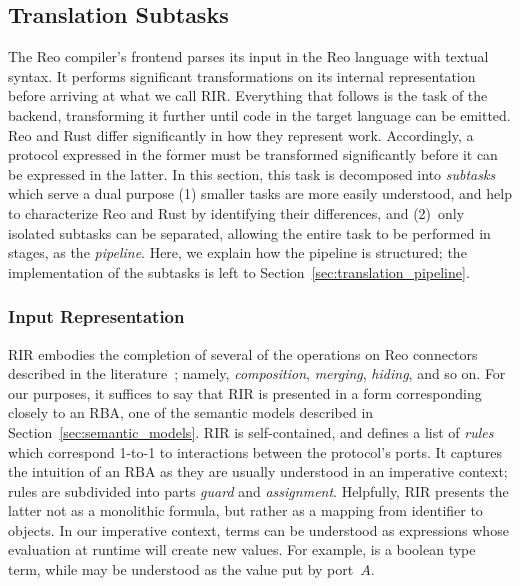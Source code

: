 \subsection{Translation Subtasks}
\label{sec:sub_tasks}
The Reo compiler's frontend parses its input in the Reo language with textual syntax. It performs significant transformations on its internal representation before arriving at what we call RIR. Everything that follows is the task of the backend, transforming it further until code in the target language can be emitted. Reo and Rust differ significantly in how they represent work. Accordingly, a protocol expressed in the former must be transformed significantly before it can be expressed in the latter. In this section, this task is decomposed into \textit{subtasks} which serve a dual purpose (1) smaller tasks are more easily understood, and help to characterize Reo and Rust by identifying their differences, and (2)~only isolated subtasks can be separated, allowing the entire task to be performed in stages, as the \textit{pipeline}.  Here, we explain how the pipeline is structured; the implementation of the subtasks is left to Section~\ref{sec:translation_pipeline}.

\subsubsection{Input Representation}
RIR embodies the completion of several of the operations on Reo connectors described in the literature~\cite{baier2006modeling, dokter2018rule}; namely, \textit{composition}, \textit{merging}, \textit{hiding}, and so on. For our purposes, it suffices to say that RIR is presented in a form corresponding closely to an RBA, one of the semantic models described in Section~\ref{sec:semantic_models}. RIR is self-contained, and defines a list of \textit{rules} which correspond 1-to-1 to interactions between the protocol's ports. It captures the intuition of an RBA as they are usually understood in an imperative context; rules are subdivided into parts \textit{guard} and \textit{assignment}. Helpfully, RIR presents the latter not as a monolithic formula, but rather as a mapping from identifier to  objects. In our imperative context, terms can be understood as expressions whose evaluation at runtime will create new values. For example,  is a boolean type term, while  may be understood as the value put by port~$A$.

